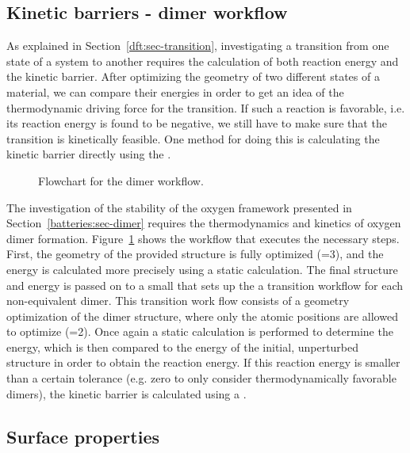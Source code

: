 \begin{refsection}
\subsection{Kinetic barriers - dimer workflow}

As explained in Section~\ref{dft:sec-transition}, investigating a transition from one state of a system to another requires the calculation of both reaction energy and the kinetic barrier. After optimizing the geometry of two different states of a material, we can compare their energies in order to get an idea of the thermodynamic driving force for the transition. If such a reaction is favorable, i.e. its reaction energy is found to be negative, we still have to make sure that the transition is kinetically feasible. One method for doing this is calculating the kinetic barrier directly using the .

\begin{figure}[ht!]
\centering

\caption{\label{automation:fig-dimer} Flowchart for the dimer workflow.}
\end{figure}

The investigation of the stability of the oxygen framework presented in Section~\ref{batteries:sec-dimer} requires the thermodynamics and kinetics of oxygen dimer formation. Figure~\ref{automation:fig-dimer} shows the workflow that executes the necessary steps. First, the geometry of the provided structure is fully optimized (=3), and the energy is calculated more precisely using a static calculation. The final structure and energy is passed on to a small  that sets up the a transition workflow for each non-equivalent dimer. This transition work flow consists of a geometry optimization of the dimer structure, where only the atomic positions are allowed to optimize (=2). Once again a static calculation is performed to determine the energy, which is then compared to the energy of the initial, unperturbed structure in order to obtain the reaction energy. If this reaction energy is smaller than a certain tolerance (e.g. zero to only consider thermodynamically favorable dimers), the kinetic barrier is calculated using a .

\subsection{Surface properties}\label{automation:sec-surface}


\end{refsection}
